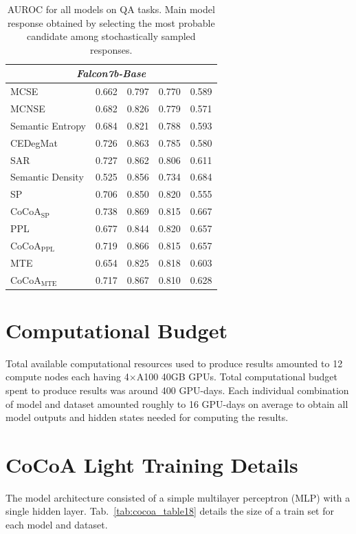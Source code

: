 \documentclass[11pt]{article}
\newcommand{\tabref}[1]{Tab.~\ref{#1}}
\begin{document}
\begin{table}[htbp]
{\begin{tabular}{l cccc}
\multicolumn{5}{c}{\textit{Falcon7b-Base}} \\
\midrule
MCSE & 0.662 & 0.797 & 0.770 & 0.589 \\
MCNSE & 0.682 & 0.826 & 0.779 & 0.571 \\
Semantic Entropy & 0.684 & 0.821 & 0.788 & 0.593 \\
CEDegMat & 0.726 & 0.863 & 0.785 & 0.580 \\
SAR & 0.727 & 0.862 & 0.806 & 0.611 \\
Semantic Density & 0.525 & 0.856 & 0.734 & 0.684 \\
SP & 0.706 & 0.850 & 0.820 & 0.555 \\
CoCoA$_{\mathrm{SP}}$ & 0.738 & 0.869 & 0.815 & 0.667 \\
PPL & 0.677 & 0.844 & 0.820 & 0.657 \\
CoCoA$_{\mathrm{PPL}}$ & 0.719 & 0.866 & 0.815 & 0.657 \\
MTE & 0.654 & 0.825 & 0.818 & 0.603 \\
CoCoA$_{\mathrm{MTE}}$ & 0.717 & 0.867 & 0.810 & 0.628 \\
\bottomrule
\end{tabular}%
}
\caption{AUROC for all models on QA tasks. Main model response obtained by selecting the most probable candidate among stochastically sampled responses.}
\label{tab:cocoa_table17}
\end{table}
\section{Computational Budget}
\label{app:compute}

Total available computational resources used to produce results amounted to 12 compute nodes each having 4$\times$A100 40GB GPUs. Total computational budget spent to produce results was around 400 GPU-days. Each individual combination of model and dataset amounted roughly to 16 GPU-days on average to obtain all model outputs and hidden states needed for computing the results.


\section{CoCoA Light Training Details}
\label{app:cocoa_light_training}

The model architecture consisted of a simple multilayer perceptron (MLP) with a single hidden layer. \tabref{tab:cocoa_table18} details the size of a train set for each model and dataset.
\end{document}

